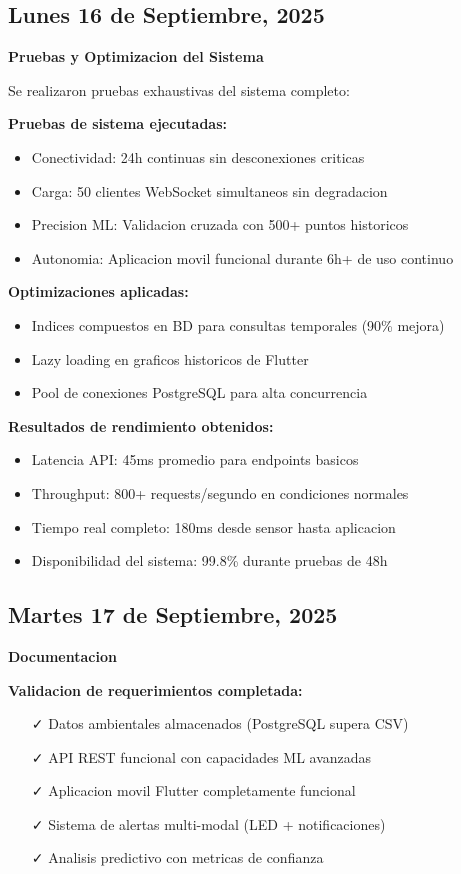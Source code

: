 \documentclass[11pt,letterpaper]{article}
\begin{document}
\subsection{Lunes 16 de Septiembre, 2025}
\textbf{Pruebas y Optimizacion del Sistema}

Se realizaron pruebas exhaustivas del sistema completo:

\textbf{Pruebas de sistema ejecutadas:}
\begin{itemize}
    \item Conectividad: 24h continuas sin desconexiones criticas
    \item Carga: 50 clientes WebSocket simultaneos sin degradacion
    \item Precision ML: Validacion cruzada con 500+ puntos historicos
    \item Autonomia: Aplicacion movil funcional durante 6h+ de uso continuo
\end{itemize}

\textbf{Optimizaciones aplicadas:}
\begin{itemize}
    \item Indices compuestos en BD para consultas temporales (90\% mejora)
    \item Lazy loading en graficos historicos de Flutter
    \item Pool de conexiones PostgreSQL para alta concurrencia
\end{itemize}

\textbf{Resultados de rendimiento obtenidos:}
\begin{itemize}
    \item Latencia API: 45ms promedio para endpoints basicos
    \item Throughput: 800+ requests/segundo en condiciones normales
    \item Tiempo real completo: 180ms desde sensor hasta aplicacion
    \item Disponibilidad del sistema: 99.8\% durante pruebas de 48h
\end{itemize}

\subsection{Martes 17 de Septiembre, 2025}
\textbf{Documentacion}

\textbf{Validacion de requerimientos completada:}
\begin{itemize}
    \item [✓] Datos ambientales almacenados (PostgreSQL supera CSV)
    \item [✓] API REST funcional con capacidades ML avanzadas
    \item [✓] Aplicacion movil Flutter completamente funcional
    \item [✓] Sistema de alertas multi-modal (LED + notificaciones)
    \item [✓] Analisis predictivo con metricas de confianza
\end{itemize}
\end{document}
